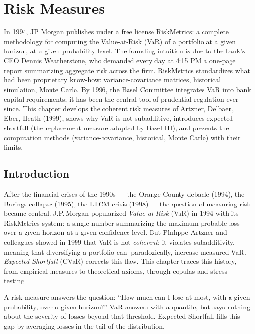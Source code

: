 \chapter{Risk Measures}
\label{ch:risk}

In 1994, JP Morgan publishes under a free license RiskMetrics: a complete methodology for computing the Value-at-Risk (VaR) of a portfolio at a given horizon, at a given probability level. The founding intuition is due to the bank's CEO Dennis Weatherstone, who demanded every day at 4:15 PM a one-page report summarizing aggregate risk across the firm. RiskMetrics standardizes what had been proprietary know-how: variance-covariance matrices, historical simulation, Monte Carlo. By 1996, the Basel Committee integrates VaR into bank capital requirements; it has been the central tool of prudential regulation ever since. This chapter develops the coherent risk measures of Artzner, Delbaen, Eber, Heath (1999), shows why VaR is not subadditive, introduces expected shortfall (the replacement measure adopted by Basel III), and presents the computation methods (variance-covariance, historical, Monte Carlo) with their limits.

\section{Introduction}

After the financial crises of the 1990s --- the Orange County debacle (1994), the Barings collapse (1995), the LTCM crisis (1998) --- the question of measuring risk became central. J.P.\,Morgan popularized \emph{Value at Risk} (VaR) in 1994 with its RiskMetrics system: a single number summarizing the maximum probable loss over a given horizon at a given confidence level. But Philippe Artzner and colleagues showed in 1999 that VaR is not \emph{coherent}: it violates subadditivity, meaning that diversifying a portfolio can, paradoxically, increase measured VaR. \emph{Expected Shortfall} (CVaR) corrects this flaw. This chapter traces this history, from empirical measures to theoretical axioms, through copulas and stress testing.

\begin{intuition}
A risk measure answers the question: ``How much can I lose at most, with a
given probability, over a given horizon?'' VaR answers with a quantile, but
says nothing about the severity of losses beyond that threshold. Expected
Shortfall fills this gap by averaging losses in the tail of the distribution.
\end{intuition}

